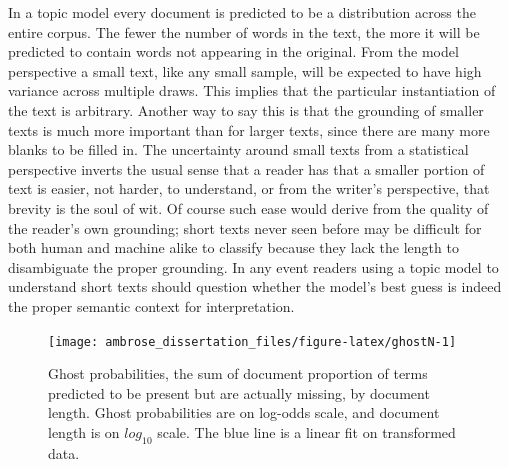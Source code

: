 \documentclass[]{book}
\theoremstyle{definition}
\theoremstyle{definition}
\theoremstyle{definition}
\theoremstyle{remark}
\begin{document}
In a topic model every document is predicted to be a distribution across
the entire corpus. The fewer the number of words in the text, the more
it will be predicted to contain words not appearing in the original.
From the model perspective a small text, like any small sample, will be
expected to have high variance across multiple draws. This implies that
the particular instantiation of the text is arbitrary. Another way to
say this is that the grounding of smaller texts is much more important
than for larger texts, since there are many more blanks to be filled in.
The uncertainty around small texts from a statistical perspective
inverts the usual sense that a reader has that a smaller portion of text
is easier, not harder, to understand, or from the writer's perspective,
that brevity is the soul of wit. Of course such ease would derive from
the quality of the reader's own grounding; short texts never seen before
may be difficult for both human and machine alike to classify because
they lack the length to disambiguate the proper grounding. In any event
readers using a topic model to understand short texts should question
whether the model's best guess is indeed the proper semantic context for
interpretation.

\begin{figure}

{\centering \texttt{[image: ambrose\_dissertation\_files/figure-latex/ghostN-1]} 

}

\caption{Ghost probabilities, the sum of document proportion of terms predicted to be present but are actually missing, by document length. Ghost probabilities are on log-odds scale, and document length is on $log_{10}$ scale. The blue line is a linear fit on transformed data.}\label{fig:ghostN}
\end{figure}
\end{document}
